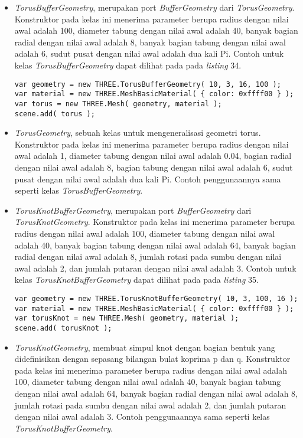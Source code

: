 \documentclass[a4paper,twoside]{article}
\begin{document}
\begin{enumerate}
\begin{itemize}
\begin{itemize}
	\item {\it TorusBufferGeometry}, merupakan port {\it BufferGeometry} dari {\it TorusGeometry}. Konstruktor pada kelas ini menerima parameter berupa radius dengan nilai awal adalah 100, diameter tabung dengan nilai awal adalah 40, banyak bagian radial dengan nilai awal adalah 8, banyak bagian tabung dengan nilai awal adalah 6, sudut pusat dengan nilai awal adalah dua kali Pi.  Contoh untuk kelas {\it TorusBufferGeometry} dapat dilihat pada pada {\it listing} 34.
	
\begin{lstlisting}[caption={Contoh penggunaan kelas {\it TorusBufferGeometry}.},captionpos=b]
var geometry = new THREE.TorusBufferGeometry( 10, 3, 16, 100 );
var material = new THREE.MeshBasicMaterial( { color: 0xffff00 } );
var torus = new THREE.Mesh( geometry, material );
scene.add( torus );
\end{lstlisting}

	\item {\it TorusGeometry}, sebuah kelas untuk mengeneralisasi geometri torus. Konstruktor pada kelas ini menerima parameter berupa radius dengan nilai awal adalah 1, diameter tabung dengan nilai awal adalah 0.04, bagian radial dengan nilai awal adalah 8, bagian tabung dengan nilai awal adalah 6, sudut pusat dengan nilai awal adalah dua kali Pi.  Contoh penggunaannya sama seperti kelas {\it TorusBufferGeometry}.
	
	\item {\it TorusKnotBufferGeometry}, merupakan port {\it BufferGeometry} dari {\it TorusKnotGeometry}. Konstruktor pada kelas ini menerima parameter berupa radius dengan nilai awal adalah 100, diameter tabung dengan nilai awal adalah 40, banyak bagian tabung dengan nilai awal adalah 64, banyak bagian radial dengan nilai awal adalah 8, jumlah rotasi pada sumbu dengan nilai awal adalah 2, dan jumlah putaran dengan nilai awal adalah 3. Contoh untuk kelas {\it TorusKnotBufferGeometry} dapat dilihat pada pada {\it listing} 35.
	
\begin{lstlisting}[caption={Contoh penggunaan kelas {\it TorusKnotBufferGeometry}.},captionpos=b]
var geometry = new THREE.TorusKnotBufferGeometry( 10, 3, 100, 16 );
var material = new THREE.MeshBasicMaterial( { color: 0xffff00 } );
var torusKnot = new THREE.Mesh( geometry, material );
scene.add( torusKnot );
\end{lstlisting}

	\item {\it TorusKnotGeometry}, membuat simpul knot dengan bagian bentuk yang didefinisikan dengan sepasang bilangan bulat koprima p dan q. Konstruktor pada kelas ini menerima parameter berupa radius dengan nilai awal adalah 100, diameter tabung dengan nilai awal adalah 40, banyak bagian tabung dengan nilai awal adalah 64, banyak bagian radial dengan nilai awal adalah 8, jumlah rotasi pada sumbu dengan nilai awal adalah 2, dan jumlah putaran dengan nilai awal adalah 3.  Contoh penggunaannya sama seperti kelas {\it TorusKnotBufferGeometry}.
	

\end{itemize}
\end{itemize}
\end{enumerate}
\end{document}
